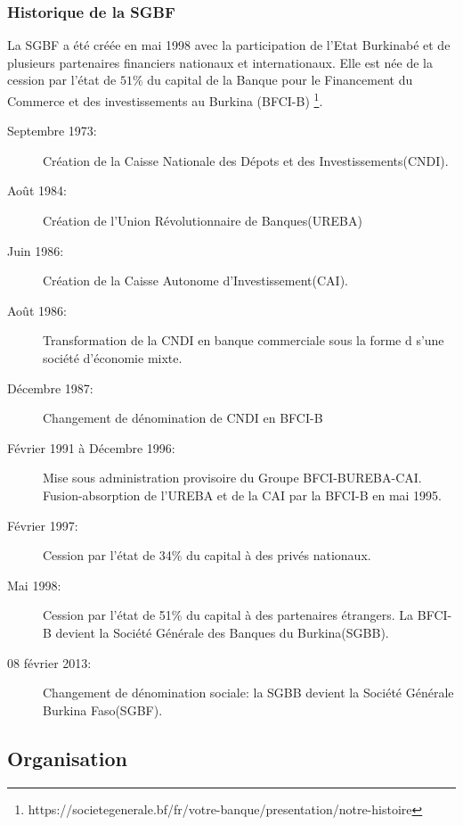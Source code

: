 \subsubsection{Historique de la SGBF}

La SGBF a été créée en mai 1998 avec la participation de l'Etat Burkinabé et de
plusieurs partenaires financiers nationaux et internationaux. Elle est née de la 
cession par l’état de $51\%$ du capital de la Banque pour le Financement du Commerce et des
investissements au Burkina (BFCI-B)
\footnote{https://societegenerale.bf/fr/votre-banque/presentation/notre-histoire}.


  \begin{description}
     \item[Septembre 1973:] Création de la Caisse Nationale des Dépots et des
       Investissements(CNDI).
    \item[Août 1984:] Création de l'Union Révolutionnaire de
      Banques(UREBA)
    \item[Juin 1986:] Création de la Caisse Autonome
      d'Investissement(CAI).
     \item[Août 1986:] Transformation de la CNDI en banque commerciale sous la forme
  d s'une société d'économie mixte.
    \item[Décembre 1987:] Changement de dénomination de CNDI en BFCI-B
    \item[Février 1991 à Décembre 1996:] Mise sous administration provisoire du
  Groupe BFCI-BUREBA-CAI. Fusion-absorption de l'UREBA et de la CAI par 
  la BFCI-B en mai 1995.
    \item[Février 1997:] Cession par l'état de 34\% du capital à des privés
      nationaux.
    \item[Mai 1998:] Cession par l'état de 51\% du capital à des partenaires
      étrangers. La BFCI-B devient la Société Générale des Banques du
      Burkina(SGBB).
    \item[08 février 2013:] Changement de dénomination sociale: la SGBB devient
      la Société Générale Burkina Faso(SGBF).
  \end{description}

  \subsection{Organisation}
